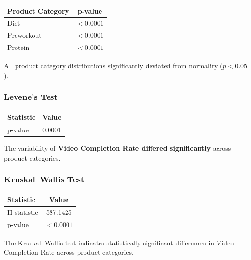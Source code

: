 \begin{table}[H]
	\centering
	\begin{tabular}{lc}
		\toprule
		Product Category & p-value \\
		\midrule
		Diet & $<0.0001$ \\
		Preworkout & $<0.0001$ \\
		Protein & $<0.0001$ \\
		\bottomrule
	\end{tabular}
\end{table}

All product category distributions significantly deviated from normality ($p<0.05$).

\vspace{0.3cm}

\subsubsection{Levene's Test}

\begin{table}[H]
	\centering
	\begin{tabular}{lc}
		\toprule
		Statistic & Value \\
		\midrule
		p-value & 0.0001 \\
		\bottomrule
	\end{tabular}
\end{table}

The variability of \textbf{Video Completion Rate differed significantly} across product categories.

\vspace{0.3cm}

\subsubsection{Kruskal--Wallis Test}

\begin{table}[H]
	\centering
	\begin{tabular}{lc}
		\toprule
		Statistic & Value \\
		\midrule
		H-statistic & 587.1425 \\
		p-value & $<0.0001$ \\
		\bottomrule
	\end{tabular}
\end{table}

The Kruskal--Wallis test indicates statistically significant differences in Video Completion Rate across product categories.

